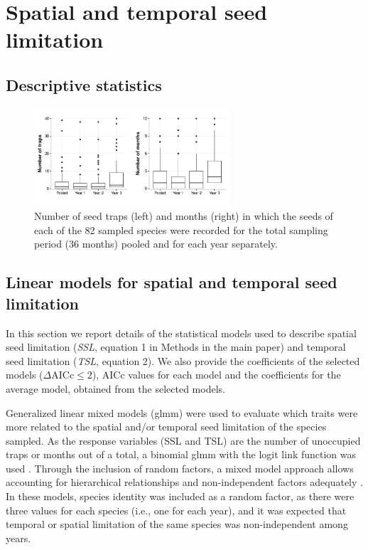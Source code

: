 \documentclass[A4]{article}
\begin{document}
\section*{Spatial and temporal seed limitation}

\subsection*{Descriptive statistics}

\begin{figure}[!htb]
  \centering
  \includegraphics[width=0.65\textwidth]{../figures/frequency_boxplots.pdf}
  \caption{Number of seed traps (left) and months (right) in which the
    seeds of each of the 82 sampled species were recorded for the total
    sampling period (36 months) pooled and for each year separately.}
  \label{fig:freq_seeds}
\end{figure}

\FloatBarrier

\subsection*{Linear models for spatial and temporal seed limitation}
\label{sec:model-select-aver}

In this section we report details of the statistical models used to
describe spatial seed limitation (\emph{SSL}, equation 1 in Methods in
the main paper) and temporal seed limitation (\emph{TSL}, equation
2). We also provide the coefficients of the selected models
($\Delta \mathrm{AICc} \leq 2$), $\mathrm{AICc}$ values for each model and the
coefficients for the average model, obtained from the selected models.


Generalized linear mixed models (glmm) were used to evaluate which
traits were more related to the spatial and/or temporal seed
limitation of the species sampled. As the response variables (SSL and
TSL) are the number of unoccupied traps or months out of a total, a
binomial glmm with the logit link function was used
\cite{bolker2009,dobson2018}. Through the inclusion of random factors,
a mixed model approach allows accounting for hierarchical
relationships and non-independent factors adequately
\cite{bolker2009,Zuur2009book}.  In these models, species identity was
included as a random factor, as there were three values for each
species (i.e., one for each year), and it was expected that temporal
or spatial limitation of the same species was non-independent among
years.
\end{document}
